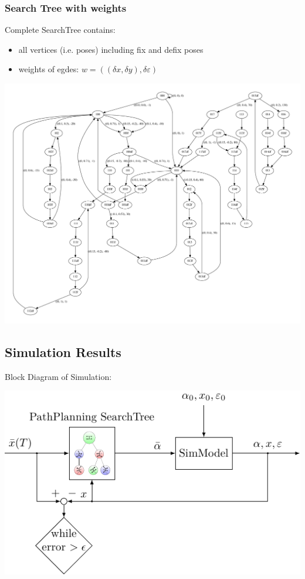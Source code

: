 \documentclass[10pt,a4paper]{article}
\begin{document}
\subsubsection{Search Tree with weights}
Complete SearchTree contains:

\begin{itemize}
	\item all vertices (i.e. poses) including fix and defix poses
	\item weights of egdes: $w = ((\delta x, \delta y), \delta \varepsilon)$
\end{itemize}

\includegraphics[width=.95\textwidth]{pics/trajectory_planner/tree_detail.pdf}


\subsection{Simulation Results}

Block Diagram of Simulation:

\includegraphics[scale=1]{pics/CtrLoops/pathplanner_searchtree.pdf}
\end{document}
